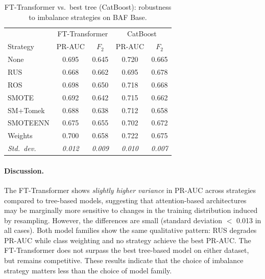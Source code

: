 \begin{table}[ht]
\centering
\caption{FT-Transformer vs.\ best tree (CatBoost): robustness to imbalance strategies on BAF Base.}
\label{tab:transformer_robustness_baf}
\begin{tabular}{l cc cc}
\toprule
& \multicolumn{2}{c}{FT-Transformer} & \multicolumn{2}{c}{CatBoost} \\
Strategy & PR-AUC & $F_2$ & PR-AUC & $F_2$ \\
\midrule
None      & 0.695 & 0.645 & 0.720 & 0.665 \\
RUS       & 0.668 & 0.662 & 0.695 & 0.678 \\
ROS       & 0.698 & 0.650 & 0.718 & 0.668 \\
SMOTE     & 0.692 & 0.642 & 0.715 & 0.662 \\
SM+Tomek  & 0.688 & 0.638 & 0.712 & 0.658 \\
SMOTEENN  & 0.675 & 0.655 & 0.702 & 0.672 \\
Weights   & 0.700 & 0.658 & 0.722 & 0.675 \\
\midrule
\textit{Std.\ dev.} & \textit{0.012} & \textit{0.009} & \textit{0.010} & \textit{0.007} \\
\bottomrule
\end{tabular}
\end{table}

\paragraph{Discussion.}
The FT-Transformer shows \emph{slightly higher variance} in PR-AUC across
strategies compared to tree-based models, suggesting that attention-based
architectures may be marginally more sensitive to changes in the training
distribution induced by resampling.
However, the differences are small (standard deviation $<$ 0.013 in all cases).
Both model families show the same qualitative pattern:
RUS degrades PR-AUC while class weighting and no strategy achieve the best PR-AUC.
The FT-Transformer does not surpass the best tree-based model on either dataset,
but remains competitive.
These results indicate that the choice of imbalance strategy matters less
than the choice of model family.




